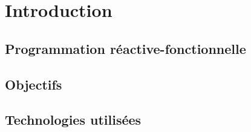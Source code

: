 \chapter{Introduction}

\section{Programmation réactive-fonctionnelle}
\section{Objectifs}

\section{Technologies utilisées}


